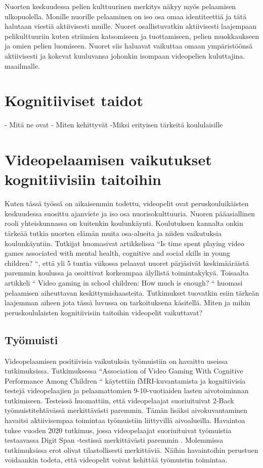 \documentclass[utf8,bachelor]{gradu3}
\begin{document}
Nuorten keskuudessa pelien kulttuurinen merkitys näkyy myös pelaamisen ulkopuolella. Monille nuorille pelaaminen on iso osa omaa identiteettiä ja tätä halutaan viestiä aktiivisesti muille. Nuoret osallistuvatkin aktiivisesti laajempaan pelikulttuuriin kuten striimien katsomiseen ja tuottamiseen, pelien muokkaukseen ja omien pelien luomiseen. Nuoret siis haluavat vaikuttaa omaan ympäristöönsä aktiivisesti ja kokevat kuuluvansa johonkin isompaan videopelien kuluttajina. maailmalle.\parencite{laakso2023lasten}  

\chapter{Kognitiiviset taidot}
- Mitä ne ovat
- Miten kehittyvät
-Miksi erityisen tärkeitä koululaisille

\chapter{Videopelaamisen vaikutukset kognitiivisiin taitoihin}

Kuten tässä työssä on aikaisemmin todettu, videopelit ovat peruskouluikäisten keskuudessa suosittu ajanviete ja iso osa nuorisokulttuuria. Nuoren pääasiallinen rooli yhteiskunnassa on kuitenkin koulunkäynti. Koulutuksen kannalta onkin tärkeää tutkia nuorten elämän muita osa-alueita ja niiden vaikutuksia koulunkäyntiin. Tutkijat \textcite{kovess2016time} huomasivat artikkelissa “Is time spent playing video games associated with mental health, cognitive and social skills in young children? “, että yli 5 tuntia viikossa pelaavat nuoret pärjäsivät keskimääräistä paremmin koulussa ja osoittivat korkeampaa älyllistä toimintakykyä. Toisaalta artikkeli “ Video gaming in school children: How much is enough? “ \parencite{pujol2016video} huomasi pelaamisen aiheuttavan keskittymishaasteita. Tutkimukset tuovatkin esiin tärkeän laajemman aiheen jota tässä luvussa on tarkoituksena käsitellä. Miten ja mihin peruskoululaisten kognitiivisiin taitoihin videopelit vaikuttavat? 

\section{Työmuisti}

Videopelaamisen positiivisia vaikutuksia työmuistiin on havaittu useissa tutkimuksissa. Tutkimuksessa “Association of Video Gaming With Cognitive Performance Among Children “ \parencite{jamanetworkopen} käytettiin fMRI-kuvantamista ja kognitiivisia testejä videopelaajien ja pelaamattomien 9-10-vuotiaiden lasten aivotoiminnan tutkimiseen. Testeissä huomattiin, että videopelaajat suoriuituivat 2-Back työmuistitehtävässä merkittävästi paremmin. Tämän lisäksi aivokuvantaminen havaitsi aktiivisempaa toimintaa työmuistiin liittyvillä aivoalueilla. Havaintoa tukee vuoden 2020 tutkimus, jossa videopelaajat suoriuituivat työmuistia testaavassa Digit Span -testissä merkittävästi paremmin \parencite{choudhury2022cognitive}. Molemmissa tutkimuksissa erot olivat tilastollisesti merkittäviä. Näihin havaintoihin perustuen voidaankin todeta, että videopelit voivat kehittää työmuistin toimintaa. 
\end{document}
